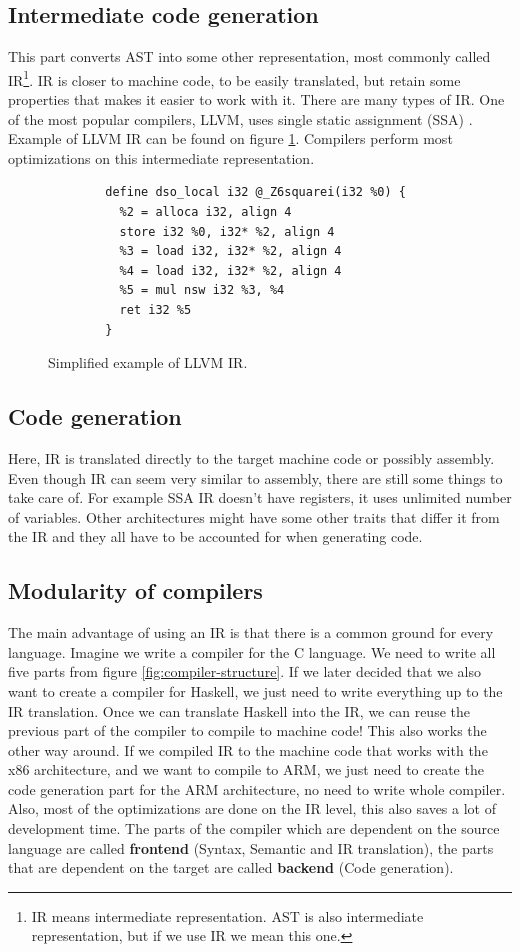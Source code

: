 \subsection{Intermediate code generation}
This part converts AST into some other representation, most commonly called
IR\footnote{IR means intermediate representation. AST is also intermediate
representation, but if we use IR we mean this one.}. IR is closer to machine
code, to be easily translated, but retain some properties that makes it easier
to work with it. There are many types of IR. One of the most popular compilers,
LLVM, uses single static assignment (SSA) \cite{llvm}. Example of LLVM IR can
be found on figure \ref{fig:llvm-ir-example}. Compilers perform most
optimizations on this intermediate representation. 

\begin{figure}\label{fig:llvm-ir-example}
    \begin{verbatim}
        define dso_local i32 @_Z6squarei(i32 %0) {
          %2 = alloca i32, align 4
          store i32 %0, i32* %2, align 4
          %3 = load i32, i32* %2, align 4
          %4 = load i32, i32* %2, align 4
          %5 = mul nsw i32 %3, %4
          ret i32 %5
        }
    \end{verbatim}
    \caption{Simplified example of LLVM IR.}
\end{figure}

\subsection{Code generation}
Here, IR is translated directly to the target machine code or possibly
assembly. Even though IR can seem very similar to assembly, there are still
some things to take care of. For example SSA IR doesn't have registers, it uses
unlimited number of variables. Other architectures might have some other traits
that differ it from the IR and they all have to be accounted for when
generating code.

\subsection{Modularity of compilers}
The main advantage of using an IR is that there is a common ground for every
language. Imagine we write a compiler for the C language. We need to write all
five parts from figure \ref{fig:compiler-structure}. If we later decided that
we also want to create a compiler for Haskell, we just need to write everything
up to the IR translation. Once we can translate Haskell into the IR, we can
reuse the previous part of the compiler to compile to machine code! This also
works the other way around. If we compiled IR to the machine code that works
with the x86 architecture, and we want to compile to ARM, we just need to
create the code generation part for the ARM architecture, no need to write
whole compiler. Also, most of the optimizations are done on the IR level, this
also saves a lot of development time. The parts of the compiler which are
dependent on the source language are called \textbf{frontend} (Syntax, Semantic
and IR translation), the parts that are dependent on the target are called
\textbf{backend} (Code generation).

